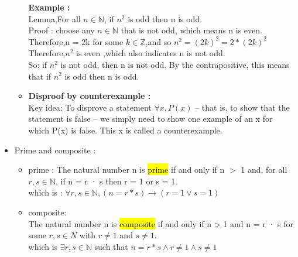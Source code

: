 \documentclass{article}
\begin{document}
\begin{itemize}
\begin{itemize}
\textbf{Example :}\\
Lemma,For all $n \in \mathbb{N}$, if $n^2$ is odd then n is odd.\\

Proof : choose any $n \in \mathbb{N}$ that is not odd, which means n is even.\\
Therefore,n = 2k for some $k \in \mathbb{Z}$,and so $n^2 = (2k)^ 2 = 2*(2k)^2$\\
Therefore,$n^2$ is even ,which also indicates n is not odd.\\
So: if $n^2$ is not odd, then n
is not odd. By the contrapositive, this means
that if $n^2$ is odd then n is odd.




\item \textbf{Disproof by counterexample : }\\
Key idea: To disprove a statement $\forall x, P(x)$ – that is, to show that the
statement is false – we simply need to show one example of an x for which
P(x) is false. This x is called a counterexample.

\end{itemize}



\item Prime and composite : 

\begin{itemize}

\item prime : The natural number n is \hl{prime} if and only if n $>$ 1 and,
for all $r,s \in \mathbb{N}$, if n = r · s then r = 1 or s = 1.\\
which is : $\forall r,s \in \mathbb{N}, (n = r * s) \rightarrow (r=1 \lor s=1)$

\item composite: \\ The natural number n is \hl{composite} if and only if n > 1 and
n = r · s for some $r,s \in N$ with $r \neq 1$ and $s \neq 1$.\\
which is $\exists r,s \in \mathbb{N}$ such that $n = r * s \land r \neq 1\land s \neq 1$\\


\end{itemize}
\end{itemize}
\end{document}
